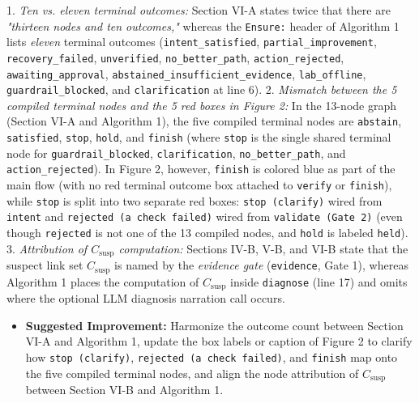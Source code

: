 \documentclass[11pt,a4paper]{article}
\begin{document}
1. \emph{Ten vs. eleven terminal outcomes:} Section VI-A states twice that there are \emph{"thirteen nodes and ten outcomes,"} whereas the \texttt{Ensure:} header of Algorithm 1 lists \emph{eleven} terminal outcomes (\texttt{intent\_satisfied}, \texttt{partial\_improvement}, \texttt{recovery\_failed}, \texttt{unverified}, \texttt{no\_better\_path}, \texttt{action\_rejected}, \texttt{awaiting\_approval}, \texttt{abstained\_insufficient\_evidence}, \texttt{lab\_offline}, \texttt{guardrail\_blocked}, and \texttt{clarification} at line 6).
2. \emph{Mismatch between the 5 compiled terminal nodes and the 5 red boxes in Figure 2:} In the 13-node graph (Section VI-A and Algorithm 1), the five compiled terminal nodes are \texttt{abstain}, \texttt{satisfied}, \texttt{stop}, \texttt{hold}, and \texttt{finish} (where \texttt{stop} is the single shared terminal node for \texttt{guardrail\_blocked}, \texttt{clarification}, \texttt{no\_better\_path}, and \texttt{action\_rejected}). In Figure 2, however, \texttt{finish} is colored blue as part of the main flow (with no red terminal outcome box attached to \texttt{verify} or \texttt{finish}), while \texttt{stop} is split into two separate red boxes: \texttt{stop (clarify)} wired from \texttt{intent} and \texttt{rejected (a check failed)} wired from \texttt{validate (Gate 2)} (even though \texttt{rejected} is not one of the 13 compiled nodes, and \texttt{hold} is labeled \texttt{held}).
3. \emph{Attribution of $C_{\text{susp}}$ computation:} Sections IV-B, V-B, and VI-B state that the suspect link set $C_{\text{susp}}$ is named by the \emph{evidence gate} (\texttt{evidence}, Gate 1), whereas Algorithm 1 places the computation of $C_{\text{susp}}$ inside \texttt{diagnose} (line 17) and omits where the optional LLM diagnosis narration call occurs.
\begin{itemize}[leftmargin=1.8em,itemsep=2pt]
\item \textbf{Suggested Improvement:} Harmonize the outcome count between Section VI-A and Algorithm 1, update the box labels or caption of Figure 2 to clarify how \texttt{stop (clarify)}, \texttt{rejected (a check failed)}, and \texttt{finish} map onto the five compiled terminal nodes, and align the node attribution of $C_{\text{susp}}$ between Section VI-B and Algorithm 1.
\end{itemize}
\end{document}
